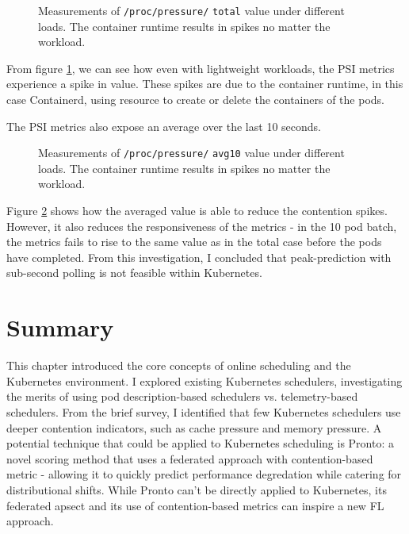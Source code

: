 \begin{figure}[h]
    \centering
    \caption{Measurements of \texttt{/proc/pressure/} \texttt{total} value under
    different loads. The container runtime results in spikes no matter the
    workload.}
    \label{fig:pressure}
\end{figure}

From figure \ref{fig:pressure}, we can see how even with lightweight workloads,
the PSI metrics experience a spike in value. These spikes are due to the
container runtime, in this case Containerd, using resource to create or delete
the containers of the pods.

The PSI metrics also expose an average over the last 10 seconds.
\begin{figure}[h]
    \centering
    \caption{Measurements of \texttt{/proc/pressure/} \texttt{avg10} value
    under different loads. The container runtime results in spikes no matter the
    workload.} \label{fig:pressure-avg}
\end{figure}
Figure \ref{fig:pressure-avg} shows how the averaged value is able to reduce the
contention spikes. However, it also reduces the responsiveness of the metrics -
in the 10 pod batch, the metrics fails to rise to the same value as in the
total case before the pods have completed. From this investigation, I concluded
that peak-prediction with sub-second polling is not feasible within Kubernetes.

\section{Summary}

This chapter introduced the core concepts of online scheduling and the
Kubernetes environment. I explored existing Kubernetes schedulers, investigating
the merits of using pod description-based schedulers vs. telemetry-based
schedulers. From the brief survey, I identified that few Kubernetes schedulers
use deeper contention indicators, such as cache pressure and memory pressure.
A potential technique that could be applied to Kubernetes scheduling is Pronto:
a novel scoring method that uses a federated approach with contention-based
metric - allowing it to quickly predict performance degredation while catering
for distributional shifts. While Pronto can't be directly applied to Kubernetes,
its federated apsect and its use of contention-based metrics can inspire a new
FL approach.


